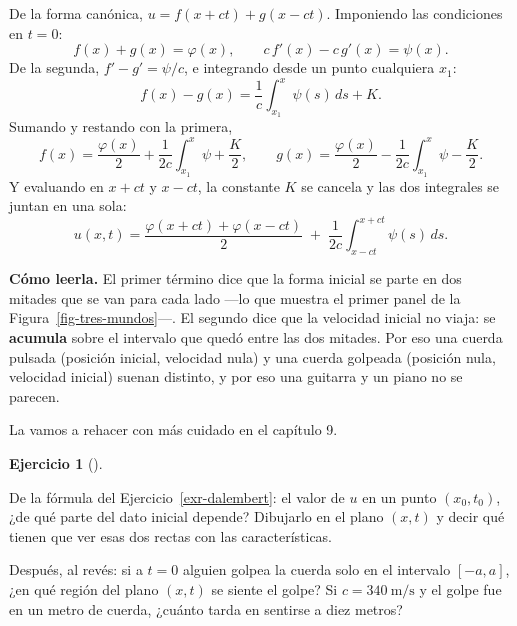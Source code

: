 \documentclass[
  spanish,
  a4paper,
]{scrbook}
\theoremstyle{definition}
\theoremstyle{plain}
\theoremstyle{definition}
\theoremstyle{plain}
\theoremstyle{definition}
\newtheorem{exercise}{Ejercicio}[chapter]
\theoremstyle{remark}
\begin{document}
\begin{tcolorbox}[enhanced jigsaw, arc=.35mm, bottomrule=.15mm, bottomtitle=1mm, breakable, colback=white, colbacktitle=quarto-callout-tip-color!10!white, colframe=quarto-callout-tip-color-frame, coltitle=black, left=2mm, leftrule=.75mm, opacityback=0, opacitybacktitle=0.6, rightrule=.15mm, title=\textcolor{quarto-callout-tip-color}{\faLightbulb}\hspace{0.5em}{Solución}, titlerule=0mm, toprule=.15mm, toptitle=1mm]

De la forma canónica, \(u = f(x+ct) + g(x-ct)\). Imponiendo las
condiciones en \(t=0\): \[
f(x) + g(x) = \varphi(x), \qquad
c\,f'(x) - c\,g'(x) = \psi(x) .
\] De la segunda, \(f'-g' = \psi/c\), e integrando desde un punto
cualquiera \(x_1\):
\[f(x) - g(x) = \frac{1}{c}\int_{x_1}^{x}\psi(s)\,ds + K .\] Sumando y
restando con la primera, \[
f(x) = \frac{\varphi(x)}{2} + \frac{1}{2c}\int_{x_1}^{x}\psi + \frac{K}{2}, \qquad
g(x) = \frac{\varphi(x)}{2} - \frac{1}{2c}\int_{x_1}^{x}\psi - \frac{K}{2} .
\] Y evaluando en \(x+ct\) y \(x-ct\), la constante \(K\) se cancela y
las dos integrales se juntan en una sola: \[
\boxed{\;u(x,t) = \frac{\varphi(x+ct) + \varphi(x-ct)}{2}
\;+\; \frac{1}{2c}\int_{x-ct}^{x+ct}\psi(s)\,ds .\;}
\]

\textbf{Cómo leerla.} El primer término dice que la forma inicial se
parte en dos mitades que se van para cada lado ---lo que muestra el
primer panel de la Figura~\ref{fig-tres-mundos}---. El segundo dice que
la velocidad inicial no viaja: se \textbf{acumula} sobre el intervalo
que quedó entre las dos mitades. Por eso una cuerda pulsada (posición
inicial, velocidad nula) y una cuerda golpeada (posición nula, velocidad
inicial) suenan distinto, y por eso una guitarra y un piano no se
parecen.

La vamos a rehacer con más cuidado en el capítulo 9.

\end{tcolorbox}

\begin{exercise}[]\protect\hypertarget{exr-dominio-dependencia}{}\label{exr-dominio-dependencia}

De la fórmula del Ejercicio~\ref{exr-dalembert}: el valor de \(u\) en un
punto \((x_0,t_0)\), ¿de qué parte del dato inicial depende? Dibujarlo
en el plano \((x,t)\) y decir qué tienen que ver esas dos rectas con las
características.

Después, al revés: si a \(t=0\) alguien golpea la cuerda solo en el
intervalo \([-a,a]\), ¿en qué región del plano \((x,t)\) se siente el
golpe? Si \(c = 340\ \text{m/s}\) y el golpe fue en un metro de cuerda,
¿cuánto tarda en sentirse a diez metros?

\end{exercise}
\end{document}
